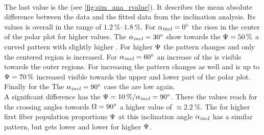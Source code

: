 \paragraph{\rvalue}
The last value is the \rvalue{} (see \cref{fig:sim_ana_rvalue}).
It describes the mean absolute difference between the data and the fitted data from the inclination analysis.
Its values is overall in the range of $\SIrange{1.2}{1.8}{\percent}$.
For $\textnormal{$\alpha_{\mathit{incl}}$} = \SI{0}{\degree}$ the \rvalue{} rises in the center of the polar plot for higher \modelPsi{} values.
The $\textnormal{$\alpha_{\mathit{incl}}$} = \SI{30}{\degree}$ show towards the $\textnormal{$\Psi$} = \SI{50}{\percent}$ a curved pattern with slightly higher \rvalue{}.
For higher $\textnormal{$\Psi$}$ the pattern changes and only the centered region is increased.
For $\textnormal{$\alpha_{\mathit{incl}}$} = \SI{60}{\degree}$ an increase of the \rvalue{} is visible towards the outer regions.
For increasing \modelInc{} the pattern changes as well and is up to $\textnormal{$\Psi$}=\SI{70}{\percent}$ increased visible towards the upper and lower part of the polar plot.
Finally for the The $\textnormal{$\alpha_{\mathit{incl}}$} = \SI{90}{\degree}$ case the \rvalue{} are low again.
\\
A significant difference has the $\textnormal{$\Psi$} = \SI{10}{\percent} / \textnormal{$\alpha_{\mathit{incl}}$} = \SI{90}{\degree}$.
There the values reach for the crossing angles towords $\textnormal{$\Omega$} = \SI{90}{\degree}$ a higher value of $\approx \SI{2.2}{\percent}$.
The \rvalue{} for higher first fiber population proportions $\textnormal{$\Psi$}$ at this inclination angle $\textnormal{$\alpha_{\mathit{incl}}$}$ has a similar pattern, but gets lower and lower for higher $\textnormal{$\Psi$}$.
% 
% 
% 
% 
